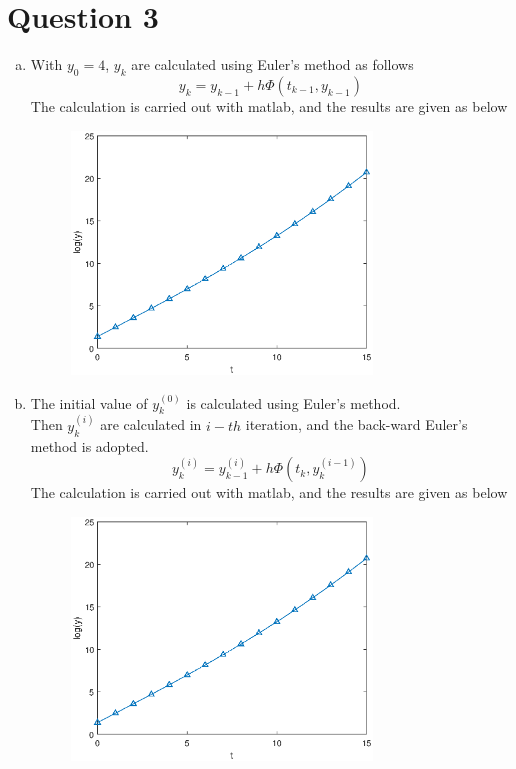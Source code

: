 \documentclass[paper=a4, fontsize=11pt]{scrartcl} %
\numberwithin{equation}{section} %
\numberwithin{figure}{section} %
\numberwithin{table}{section} %
\begin{document}
\section{Question 3}
	\begin{enumerate}[(a)]
		\item 
			With $y_0 = 4$, $y_k$ are calculated using Euler's method as follows
			\begin{equation}
				y_k = y_{k-1} + h \Phi(t_{k-1}, y_{k-1})
			\end{equation}
			The calculation is carried out with matlab, and the results are given as below
			\begin{figure}[!htbp]
				\centering
				\includegraphics[width=8cm]{../pic/Q3_a.eps}
			\end{figure}
		\item 
			The initial value of $y_k^{(0)}$ is calculated using Euler's method.\\
			Then $y_k^{(i)}$ are calculated in $i-th$ iteration, and the back-ward Euler's method is adopted.
			\begin{equation}
				y_k^{(i)} = y_{k-1}^{(i)} + h \Phi(t_{k}, y_k^{(i-1)})
			\end{equation} 
			The calculation is carried out with matlab, and the results are given as below
			\begin{figure}[!htbp]
				\centering
				\includegraphics[width=8cm]{../pic/Q3_b.eps}

\end{figure}
\end{enumerate}
\end{document}
